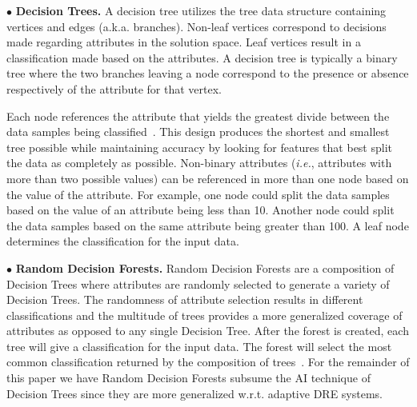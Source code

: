 \documentclass[conference]{IEEEtran}
\begin{document}
$\bullet$ {\bf Decision Trees.} A decision tree utilizes the tree data structure containing vertices and edges (a.k.a. branches). Non-leaf vertices correspond to decisions made regarding attributes in the solution space. Leaf vertices result in a classification made based on the attributes. A decision tree is typically a binary tree where the two branches leaving a node correspond to the presence or absence respectively of the attribute for that vertex.

Each node references the attribute that yields the greatest divide between the data samples being classified~\cite{Russell:10}. This design produces the shortest and smallest tree
possible while maintaining accuracy by looking for features that
best split the data as completely as possible.
Non-binary attributes (\emph{i.e.}, attributes with more than two possible values) can be referenced in more than one node based on the value of the attribute. For example, one node could split the data samples based on the value of an attribute being less than 10. Another node could split the data samples based on the same attribute being greater than 100. A leaf node determines the classification for the input data.



$\bullet$ {\bf Random Decision Forests.}
Random Decision Forests are a composition of Decision Trees where attributes are randomly selected to generate a variety of Decision Trees. The randomness of attribute selection results in different classifications and the multitude of trees provides a more generalized coverage of attributes as opposed to any single Decision Tree.
After the forest is created, each tree will give a classification for the input data. The forest will select the most common classification returned by the composition of trees~\cite{Lin:06}.  For the remainder of this paper we have Random Decision Forests subsume the AI technique of Decision Trees since they are more generalized w.r.t. adaptive DRE systems.
\end{document}
